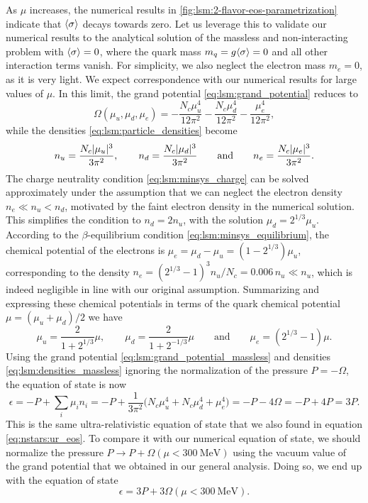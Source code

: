 As $\mu$ increases, the numerical results in \cref{fig:lsm:2-flavor-eos-parametrization} indicate that $\langle \sigma \rangle$ decays towards zero.
Let us leverage this to validate our numerical results to the analytical solution of the massless and non-interacting problem with $\langle \sigma \rangle = 0$,
where the quark mass $m_q = g \langle \sigma \rangle = 0$ and all other interaction terms vanish.
For simplicity, we also neglect the electron mass $m_e = 0$, as it is very light.
We expect correspondence with our numerical results for large values of $\mu$.
In this limit, the grand potential \eqref{eq:lsm:grand_potential} reduces to
\begin{equation}
	\Omega(\mu_u, \mu_d, \mu_e) = -\frac{N_c \mu_u^4}{12 \pi^2} - \frac{N_c \mu_d^4}{12 \pi^2} - \frac{\mu_e^4}{12 \pi^2},
\label{eq:lsm:grand_potential_massless}
\end{equation}
while the densities \eqref{eq:lsm:particle_densities} become
\begin{equation}
	n_u = \frac{N_c \lvert \mu_u \rvert^3}{3 \pi^2}, \qquad
	n_d = \frac{N_c \lvert \mu_d \rvert^3}{3 \pi^2}  \qquad \text{and} \qquad
	n_e = \frac{N_c \lvert \mu_e \rvert^3}{3 \pi^2}.
\label{eq:lsm:densities_massless}
\end{equation}
The charge neutrality condition \eqref{eq:lsm:minsys_charge} can be solved approximately under the assumption that we can neglect the electron density $n_e \ll n_u < n_d$,
motivated by the faint electron density in the numerical solution.
This simplifies the condition to $n_d = 2 n_u$, with the solution $\mu_d = 2^{1/3} \mu_u$.
According to the $\beta$-equilibrium condition \eqref{eq:lsm:minsys_equilibrium},
the chemical potential of the electrons is $\mu_e = \mu_d - \mu_u = (1-2^{1/3}) \mu_u$,
corresponding to the density $n_e = (2^{1/3}-1)^3 n_u / N_c = 0.006 \, n_u \ll n_u$,
which is indeed negligible in line with our original assumption.
Summarizing and expressing these chemical potentials in terms of the quark chemical potential $\mu = (\mu_u+\mu_d)/2$ we have
\begin{equation}
	\mu_u = \frac{2}{1+2^{1/3}} \mu, \qquad
	\mu_d = \frac{2}{1+2^{-1/3}} \mu \qquad \text{and} \qquad
	\mu_e = (2^{1/3}-1) \mu.
\label{eq:lsm:chemical_potentials_massless}
\end{equation}
Using the grand potential \eqref{eq:lsm:grand_potential_massless} and densities \eqref{eq:lsm:densities_massless} ignoring the normalization of the pressure $P = -\Omega$, the equation of state is now
\begin{equation}
	\epsilon = -P + \sum_i \mu_i n_i = -P + \frac{1}{3 \pi^2} \Big(N_c \mu_u^4 + N_c \mu_d^4 + \mu_e^4\Big) = -P - 4 \Omega = -P + 4 P = 3 P .
\end{equation}
This is the same ultra-relativistic equation of state that we also found in equation \eqref{eq:nstars:ur_eos}.
To compare it with our numerical equation of state, we should normalize the pressure $P \rightarrow P + \Omega(\mu<\SI{300}{\mega\electronvolt})$ using the vacuum value of the grand potential that we obtained in our general analysis.
Doing so, we end up with the equation of state
\begin{equation}
	\epsilon = 3 P + 3 \Omega(\mu<\SI{300}{\mega\electronvolt}).
\label{eq:lsm:eos_massless}
\end{equation}

